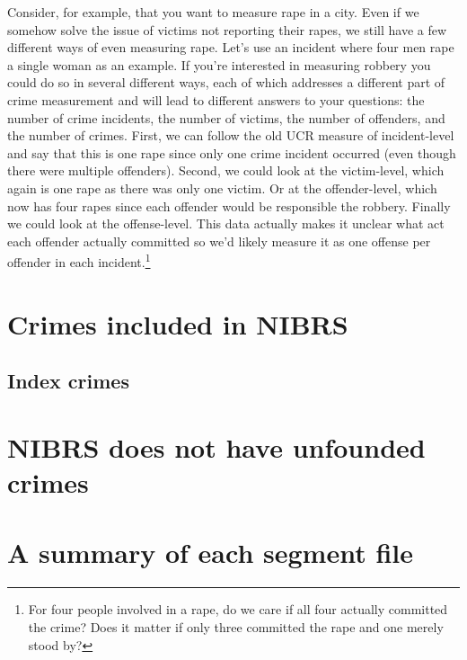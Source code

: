 \documentclass[
  12pt,
  openany]{book}
\begin{document}
Consider, for example, that you want to measure rape in a city. Even if we somehow solve the issue of victims not reporting their rapes, we still have a few different ways of even measuring rape. Let's use an incident where four men rape a single woman as an example. If you're interested in measuring robbery you could do so in several different ways, each of which addresses a different part of crime measurement and will lead to different answers to your questions: the number of crime incidents, the number of victims, the number of offenders, and the number of crimes. First, we can follow the old UCR measure of incident-level and say that this is one rape since only one crime incident occurred (even though there were multiple offenders). Second, we could look at the victim-level, which again is one rape as there was only one victim. Or at the offender-level, which now has four rapes since each offender would be responsible the robbery. Finally we could look at the offense-level. This data actually makes it unclear what act each offender actually committed so we'd likely measure it as one offense per offender in each incident.\footnote{For four people involved in a rape, do we care if all four actually committed the crime? Does it matter if only three committed the rape and one merely stood by?}

\hypertarget{crimes-included-in-nibrs}{%
\section{Crimes included in NIBRS}\label{crimes-included-in-nibrs}}

\hypertarget{index-crimes}{%
\subsection{Index crimes}\label{index-crimes}}

\hypertarget{nibrs-does-not-have-unfounded-crimes}{%
\section{NIBRS does not have unfounded crimes}\label{nibrs-does-not-have-unfounded-crimes}}

\hypertarget{a-summary-of-each-segment-file}{%
\section{A summary of each segment file}\label{a-summary-of-each-segment-file}}
\end{document}
